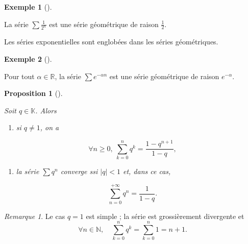 \documentclass[
  french,
  letterpaper,
  DIV=11,
  numbers=noendperiod]{scrreprt}
\providecommand{\tightlist}{%
  \setlength{\itemsep}{0pt}\setlength{\parskip}{0pt}}
\theoremstyle{plain}
\theoremstyle{definition}
\theoremstyle{plain}
\newtheorem{proposition}{Proposition}[chapter]
\theoremstyle{plain}
\theoremstyle{definition}
\theoremstyle{definition}
\newtheorem{example}{Exemple}[chapter]
\theoremstyle{plain}
\theoremstyle{remark}
\newtheorem{refremark}{Remarque}[chapter]
\begin{document}
\begin{example}[]\protect\hypertarget{exm-serie-geometrique}{}\label{exm-serie-geometrique}

La série \(\sum \frac{1}{2^{n}}\) est une série géométrique de raison
\(\frac{1}{2}\).

\end{example}

Les séries exponentielles sont englobées dans les séries géométriques.

\begin{example}[]\protect\hypertarget{exm-serie-geometrique-2}{}\label{exm-serie-geometrique-2}

Pour tout \(\alpha \in \mathbb{R}\), la série \(\sum e^{-\alpha n}\) est
une série géométrique de raison \(e^{-\alpha}\).

\end{example}

\begin{proposition}[]\protect\hypertarget{prp-serie-geometrique}{}\label{prp-serie-geometrique}

Soit \(q \in \mathbb{K}\). Alors

\begin{enumerate}
\def\labelenumi{\arabic{enumi}.}
\tightlist
\item
  si \(q \neq 1\), on a
\end{enumerate}

\[
    \forall n \geqslant 0,\ \sum_{k=0}^{n}q^{k} = \frac{1-q^{n+1}}{1-q},
\]

\begin{enumerate}
\def\labelenumi{\arabic{enumi}.}
\setcounter{enumi}{1}
\tightlist
\item
  la série \(\sum q^{n}\) converge ssi \(|q|<1\) et, dans ce cas,
\end{enumerate}

\[
    \sum_{n=0}^{+\infty} q^{n} = \frac{1}{1-q}.
\]

\end{proposition}

\begin{refremark}
Le cas \(q=1\) est simple ; la série est grossièrement divergente et \[
    \forall n \in \mathbb{N},\quad \sum_{k=0}^{n}q^{k} = \sum_{k=0}^{n}1 = n+1.
\]

\label{rem-cas-q-egal-un}

\end{refremark}
\end{document}
